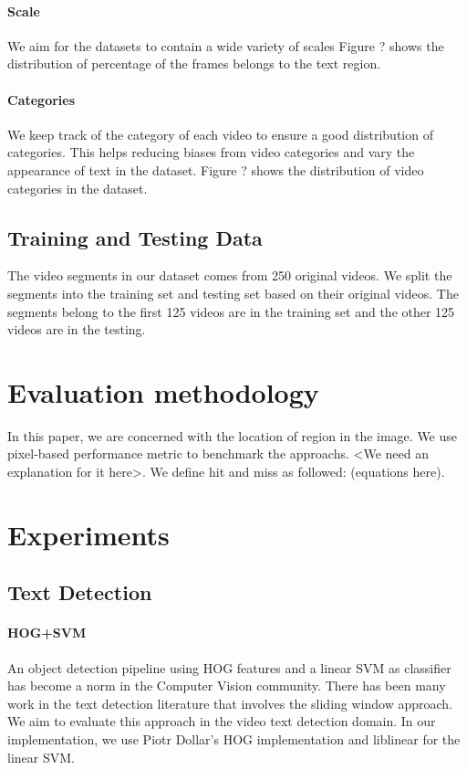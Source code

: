 \documentclass{bmvc2k}
\begin{document}
\paragraph{Scale} We aim for the datasets to contain a wide variety of scales Figure ? shows the distribution of percentage of the frames belongs to the text region.

\paragraph{Categories} We keep track of the category of each video to ensure a good distribution of categories. This helps reducing biases from video categories and vary the appearance of text in the dataset. Figure ? shows the distribution of video categories in the dataset.

\subsection{Training and Testing Data}
The video segments in our dataset comes from 250 original videos. We split the segments into the training set and testing set based on their original videos. The segments belong to the first 125 videos are in the training set and the other 125 videos are in the testing.

\section{Evaluation methodology}
In this paper, we are concerned with the location of region in the image. We use pixel-based performance metric to benchmark the approachs. <We need an explanation for it here>. We define hit and miss as followed: (equations here).

\section{Experiments}
\subsection{Text Detection}

\paragraph{HOG+SVM} An object detection pipeline using HOG features and a linear SVM as classifier has become a norm in the Computer Vision community. There has been many work in the text detection literature that involves the sliding window approach. We aim to evaluate this approach in the video text detection domain. In our implementation, we use Piotr Dollar's HOG implementation and liblinear for the linear SVM.
\end{document}
